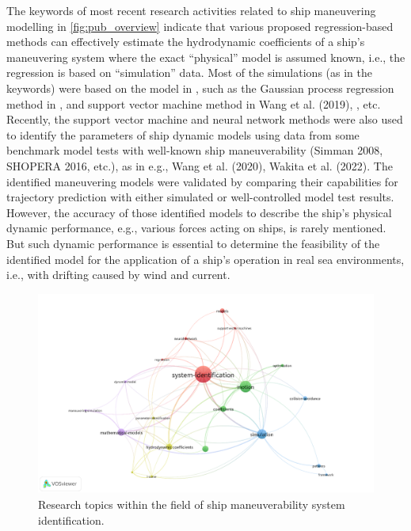 The keywords of most recent research activities related to ship maneuvering modelling in \autoref{fig:pub_overview} indicate that various proposed regression-based methods can effectively estimate the hydrodynamic coefficients of a ship’s maneuvering system where the exact “physical” model is assumed known, i.e., the regression is based on “simulation” data. 
Most of the simulations (as in the keywords) were based on the model in \citet{fossen_handbook_2021}, such as the Gaussian process regression method in \citet{xue_system_2020}, and support vector machine method in Wang et al. (2019), \citet{wang_parameter_2021}, etc. Recently, the support vector machine and neural network methods were also used to identify the parameters of ship dynamic models using data from some benchmark model tests with well-known ship maneuverability (Simman 2008, SHOPERA 2016, etc.), as in e.g., Wang et al. (2020), Wakita et al. (2022). The identified maneuvering models were validated by comparing their capabilities for trajectory prediction with either simulated or well-controlled model test results. However, the accuracy of those identified models to describe the ship’s physical dynamic performance, e.g., various forces acting on ships, is rarely mentioned. But such dynamic performance is essential to determine the feasibility of the identified model for the application of a ship’s operation in real sea environments, i.e., with drifting caused by wind and current.
\begin{figure}[h]
  \includegraphics[width=\textwidth]{figures/keywords.png}
  \caption{Research topics within the field of ship maneuverability system identification.}
  \label{fig:pub_overview}
\end{figure}


